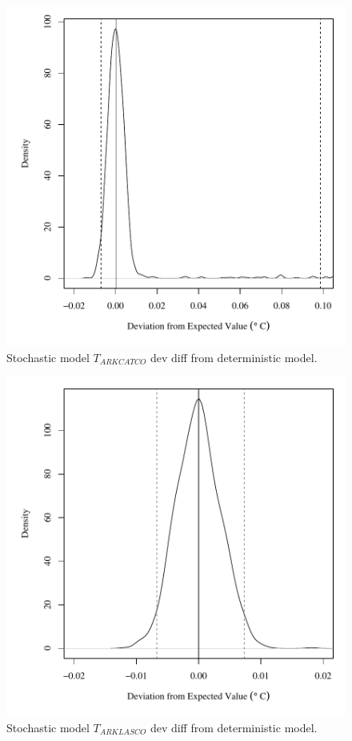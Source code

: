 \begin{center}
\begin{figure}[htbp]
	\includegraphics[width=6in]{"Figures/Results_USR/V dev diff tin"}
	\caption{Stochastic model $T_{ARKCATCO}$ dev diff from deterministic model.}
\end{figure}
\end{center}
\newpage

\begin{center}
\begin{figure}[htbp]
	\includegraphics[width=6in]{"Figures/Results_USR/V dev diff tout"}
	\caption{Stochastic model $T_{ARKLASCO}$ dev diff from deterministic model.}
\end{figure}
\end{center}
\newpage


